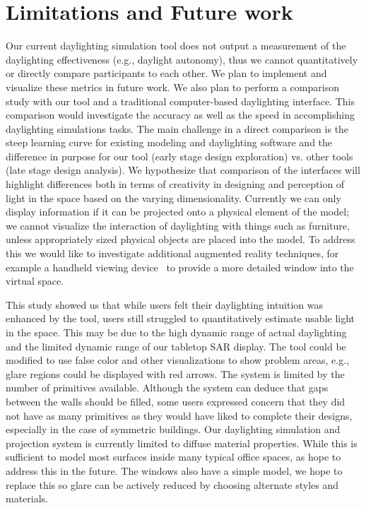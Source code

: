 \documentclass[review]{vgtc}                 %
\begin{document}
\section{Limitations and Future work}

Our current daylighting simulation tool does not output a measurement
of the daylighting effectiveness (e.g., daylight autonomy), thus we
cannot quantitatively or directly compare participants to each other.
We plan to implement and visualize these metrics in future work.  We
also plan to perform a comparison study with our tool and a
traditional computer-based daylighting interface.  This comparison
would investigate the accuracy as well as the speed in accomplishing
daylighting simulations tasks.  The main challenge in a direct
comparison is the steep learning curve for existing modeling and
daylighting software and the difference in purpose for our tool (early
stage design exploration) vs. other tools (late stage design
analysis).  We hypothesize that comparison of the interfaces will
highlight differences both in terms of creativity in designing and
perception of light in the space based on the varying dimensionality.
%
Currently we can only display information if it can be projected onto
a physical element of the model; we cannot visualize the interaction
of daylighting with things such as furniture, unless appropriately
sized physical objects are placed into the model.
%
To address this we would like to investigate additional augmented
reality techniques, for example a handheld viewing
device~\cite{Ishii97tangiblebits:,642613,1517704} to provide a more
detailed window into the virtual space.

This study showed us that while users felt their daylighting intuition
was enhanced by the tool, users still struggled to quantitatively estimate
usable light in the space.  This may be due to the high dynamic range
of actual daylighting and the limited dynamic range of our tabletop
SAR display.  The tool could be modified to use false color and other
visualizations to show problem areas,
e.g., glare regions could be displayed with red arrows.  The system is
limited by the number of primitives available.  Although the system
can deduce that gaps between the walls should be filled, some users
expressed concern that they did not have as many primitives as they
would have liked to complete their designs, especially in the case of
symmetric buildings.
%
Our daylighting simulation and projection system is currently limited
to diffuse material properties.  While this is sufficient to model
most surfaces inside many typical office spaces, as hope to address
this in the future.  The windows also have a simple model, we hope to
replace this so glare can be actively reduced by choosing alternate
styles and materials.
\end{document}
